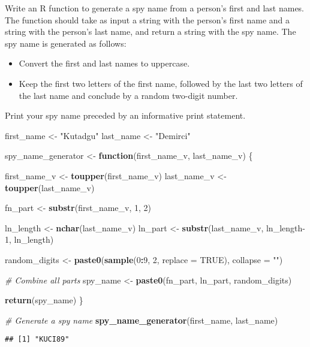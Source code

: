 \documentclass[
]{article}
\newenvironment{Shaded}{\begin{snugshade}}{\end{snugshade}}
\newcommand{\AttributeTok}[1]{\textcolor[rgb]{0.13,0.29,0.53}{#1}}
\newcommand{\CommentTok}[1]{\textcolor[rgb]{0.56,0.35,0.01}{\textit{#1}}}
\newcommand{\ConstantTok}[1]{\textcolor[rgb]{0.56,0.35,0.01}{#1}}
\newcommand{\ControlFlowTok}[1]{\textcolor[rgb]{0.13,0.29,0.53}{\textbf{#1}}}
\newcommand{\DecValTok}[1]{\textcolor[rgb]{0.00,0.00,0.81}{#1}}
\newcommand{\FunctionTok}[1]{\textcolor[rgb]{0.13,0.29,0.53}{\textbf{#1}}}
\newcommand{\NormalTok}[1]{#1}
\newcommand{\OtherTok}[1]{\textcolor[rgb]{0.56,0.35,0.01}{#1}}
\newcommand{\SpecialCharTok}[1]{\textcolor[rgb]{0.81,0.36,0.00}{\textbf{#1}}}
\newcommand{\StringTok}[1]{\textcolor[rgb]{0.31,0.60,0.02}{#1}}
\providecommand{\tightlist}{%
  \setlength{\itemsep}{0pt}\setlength{\parskip}{0pt}}
\begin{document}
Write an R function to generate a spy name from a person's first and
last names. The function should take as input a string with the person's
first name and a string with the person's last name, and return a string
with the spy name. The spy name is generated as follows:

\begin{itemize}
\tightlist
\item
  Convert the first and last names to uppercase.
\item
  Keep the first two letters of the first name, followed by the last two
  letters of the last name and conclude by a random two-digit number.
\end{itemize}

Print your spy name preceded by an informative print statement.

\begin{Shaded}
\begin{Highlighting}[]
\NormalTok{first\_name }\OtherTok{\textless{}{-}} \StringTok{"Kutadgu"}
\NormalTok{last\_name }\OtherTok{\textless{}{-}} \StringTok{"Demirci"}

\NormalTok{spy\_name\_generator }\OtherTok{\textless{}{-}} \ControlFlowTok{function}\NormalTok{(first\_name\_v, last\_name\_v) \{}
  
\NormalTok{  first\_name\_v }\OtherTok{\textless{}{-}} \FunctionTok{toupper}\NormalTok{(first\_name\_v)}
\NormalTok{  last\_name\_v }\OtherTok{\textless{}{-}} \FunctionTok{toupper}\NormalTok{(last\_name\_v)}
  
  
\NormalTok{  fn\_part }\OtherTok{\textless{}{-}} \FunctionTok{substr}\NormalTok{(first\_name\_v, }\DecValTok{1}\NormalTok{, }\DecValTok{2}\NormalTok{)}
  
  
\NormalTok{  ln\_length }\OtherTok{\textless{}{-}} \FunctionTok{nchar}\NormalTok{(last\_name\_v)}
\NormalTok{  ln\_part }\OtherTok{\textless{}{-}} \FunctionTok{substr}\NormalTok{(last\_name\_v, ln\_length}\DecValTok{{-}1}\NormalTok{, ln\_length)}
  
  
\NormalTok{  random\_digits }\OtherTok{\textless{}{-}} \FunctionTok{paste0}\NormalTok{(}\FunctionTok{sample}\NormalTok{(}\DecValTok{0}\SpecialCharTok{:}\DecValTok{9}\NormalTok{, }\DecValTok{2}\NormalTok{, }\AttributeTok{replace =} \ConstantTok{TRUE}\NormalTok{), }\AttributeTok{collapse =} \StringTok{""}\NormalTok{)}
  
  \CommentTok{\# Combine all parts}
\NormalTok{  spy\_name }\OtherTok{\textless{}{-}} \FunctionTok{paste0}\NormalTok{(fn\_part, ln\_part, random\_digits)}
  
  \FunctionTok{return}\NormalTok{(spy\_name)}
\NormalTok{\}}

\CommentTok{\# Generate a spy name}
\FunctionTok{spy\_name\_generator}\NormalTok{(first\_name, last\_name)}
\end{Highlighting}
\end{Shaded}

\begin{verbatim}
## [1] "KUCI89"
\end{verbatim}
\end{document}
